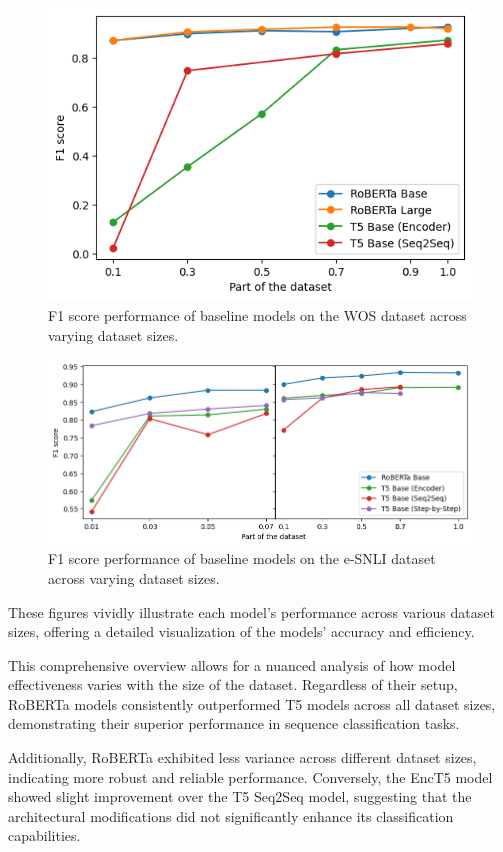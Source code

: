 \begin{figure}[p]
    \centering
    \includegraphics[width=0.63\linewidth]{figs/wos_baseline.png}
    \caption{F1 score performance of baseline models on the WOS dataset across varying dataset sizes.}
    \label{fig:baselines:wos}
\end{figure}
\begin{figure}[p]
    \centering
    \includegraphics[width=\linewidth]{figs/esnli_baseline.png}
    \caption{F1 score performance of baseline models on the e-SNLI dataset across varying dataset sizes.}
    \label{fig:baselines:esnli}
\end{figure}

These figures vividly illustrate each model's performance across various dataset sizes, offering a detailed visualization of the models' accuracy and efficiency.

This comprehensive overview allows for a nuanced analysis of how model effectiveness varies with the size of the dataset. Regardless of their setup, RoBERTa models consistently outperformed T5 models across all dataset sizes, demonstrating their superior performance in sequence classification tasks.

Additionally, RoBERTa exhibited less variance across different dataset sizes, indicating more robust and reliable performance. Conversely, the EncT5 model showed slight improvement over the T5 Seq2Seq model, suggesting that the architectural modifications did not significantly enhance its classification capabilities.

